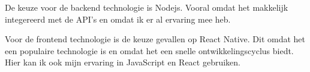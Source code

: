     De keuze voor de backend technologie is Nodejs. Vooral omdat het makkelijk integereerd met de API's en omdat ik er al ervaring mee heb.

    Voor de frontend technologie is de keuze gevallen op React Native. Dit omdat het een populaire technologie is en omdat het een snelle ontwikkelingscyclus biedt. 
    Hier kan ik ook mijn ervaring in JavaScript en React gebruiken.







